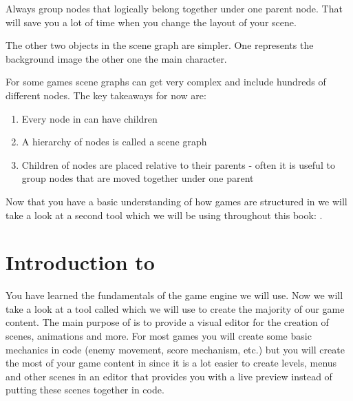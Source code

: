 \begin{bestpractice}[frametitle={Structuring Nodes}] 
Always group nodes that logically belong together under one parent node. That
will save you a lot of time when you change the layout of your scene.
\end{bestpractice}

The other two objects in the scene graph are simpler. One represents the
background image the other one the main character.

For some games scene graphs can get very complex and include hundreds of
different nodes. The key takeaways for now are:

\begin{enumerate}
  \item Every node in \cocos{} can have children
  \item A hierarchy of nodes is called a scene graph
  \item Children of nodes are placed relative to their parents - often it is
  useful to group nodes that are moved together under one parent
\end{enumerate}

Now that you have a basic understanding of how games are structured in \cocos{}
we will take a look at a second tool which we will be using throughout this
book: \SB{}.

\section{Introduction to \SB{}}
You have learned the fundamentals of the game engine we will use. Now we will
take a look at a tool called \SB{} which we will use to create the majority of
our game content. The main purpose of \SB{} is to provide a visual editor for
the creation of scenes, animations and more. For most games you will create some
basic mechanics in code (enemy movement, score mechanism, etc.) but you will create
the most of your game content in \SB{} since it is a lot easier to create
levels, menus and other scenes in an editor that provides you with a live
preview instead of putting these scenes together in code.

